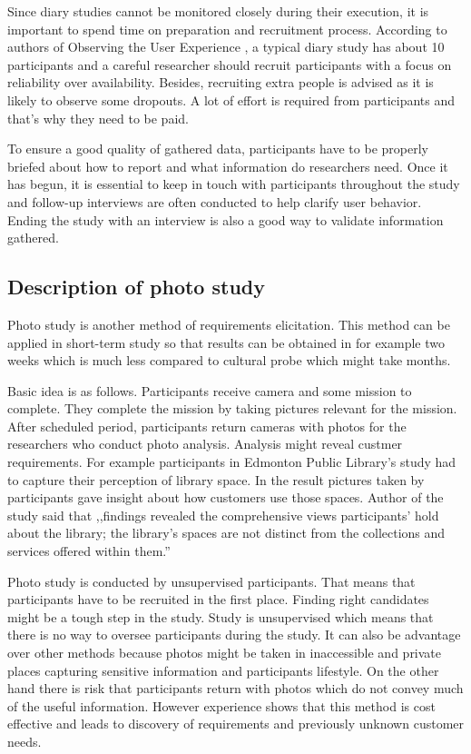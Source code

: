 \documentclass[12pt, a4paper]{article}
\begin{document}
Since diary studies cannot be monitored closely during their execution, it is important to spend time on preparation and recruitment process. According to authors of Observing the User Experience \cite{goodman2012observing}, a typical diary study has about 10 participants and a careful researcher should recruit participants with a focus on reliability over availability. Besides, recruiting extra people is advised as it is likely to observe some dropouts. A lot of effort is required from participants and that’s why they need to be paid.

To ensure a good quality of gathered data, participants have to be properly briefed about how to report and what information do researchers need. Once it has begun, it is essential to keep in touch with participants throughout the study \cite{eriontheinterweb} and follow-up interviews are often conducted to help clarify user behavior. Ending the study with an interview is also a good way to validate information gathered. 


\subsection{Description of photo study}
Photo study is another method of requirements elicitation. This method can be applied in short-term study so that results can be obtained in for example two weeks which is much less compared to cultural probe which might take months.

Basic idea is as follows. Participants receive camera and some mission to complete. They complete the mission by taking pictures relevant for the mission. After scheduled period, participants return cameras with photos for the researchers who conduct photo analysis. Analysis might reveal custmer requirements. For example participants in Edmonton Public Library's study\cite{photostudyExample} had to capture their perception of library space. In the result pictures taken by participants gave insight about how customers use those spaces. Author of the study said that ,,findings revealed the comprehensive views participants’ hold about the library; the 
library’s spaces are not distinct from the collections and services offered within them.'' 

Photo study is conducted by unsupervised participants. That means that participants have to be recruited in the first place. Finding right candidates might be a tough step in the study. Study is unsupervised which means that there is no way to oversee participants during the study. It can also be advantage over other methods because photos might be taken in inaccessible and private places capturing sensitive information and participants lifestyle. On the other hand there is risk that participants return with photos which do not convey much of the useful information. However experience shows that this method is cost effective and leads to discovery of requirements and previously unknown customer needs.
\end{document}
